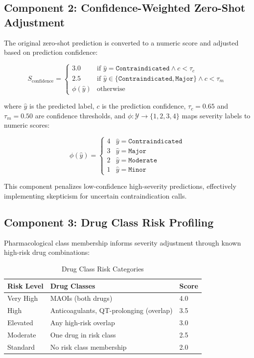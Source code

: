 \documentclass[11pt,a4paper]{article}
\begin{document}
\subsection{Component 2: Confidence-Weighted Zero-Shot Adjustment}

The original zero-shot prediction is converted to a numeric score and adjusted based on prediction confidence:

\begin{equation}
S_{\text{confidence}} = 
\begin{cases}
3.0 & \text{if } \hat{y} = \texttt{Contraindicated} \land c < \tau_c \\
2.5 & \text{if } \hat{y} \in \{\texttt{Contraindicated}, \texttt{Major}\} \land c < \tau_m \\
\phi(\hat{y}) & \text{otherwise}
\end{cases}
\end{equation}

where $\hat{y}$ is the predicted label, $c$ is the prediction confidence, $\tau_c = 0.65$ and $\tau_m = 0.50$ are confidence thresholds, and $\phi: \mathcal{Y} \to \{1, 2, 3, 4\}$ maps severity labels to numeric scores:

\begin{equation}
\phi(\hat{y}) = \begin{cases}
4 & \hat{y} = \texttt{Contraindicated} \\
3 & \hat{y} = \texttt{Major} \\
2 & \hat{y} = \texttt{Moderate} \\
1 & \hat{y} = \texttt{Minor}
\end{cases}
\end{equation}

This component penalizes low-confidence high-severity predictions, effectively implementing skepticism for uncertain contraindication calls.

\subsection{Component 3: Drug Class Risk Profiling}

Pharmacological class membership informs severity adjustment through known high-risk drug combinations:

\begin{table}[H]
\centering
\caption{Drug Class Risk Categories}
\label{tab:drug_classes}
\begin{tabular}{@{}lll@{}}
\toprule
\textbf{Risk Level} & \textbf{Drug Classes} & \textbf{Score} \\
\midrule
Very High & MAOIs (both drugs) & 4.0 \\
High & Anticoagulants, QT-prolonging (overlap) & 3.5 \\
Elevated & Any high-risk overlap & 3.0 \\
Moderate & One drug in risk class & 2.5 \\
Standard & No risk class membership & 2.0 \\
\bottomrule
\end{tabular}
\end{table}
\end{document}
